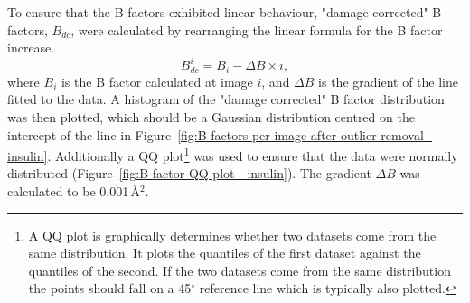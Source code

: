 To ensure that the B-factors exhibited linear behaviour, "damage corrected" B factors, $B_{dc}$, were calculated by rearranging the linear formula for the B factor increase.
\begin{equation}
    B^i_{dc} = B_i - \Delta B \times i,
\end{equation}
where $B_i$ is the B factor calculated at image $i$, and $\Delta B$ is the gradient of the line fitted to the data.
A histogram of the "damage corrected" B factor distribution was then plotted, which should be a Gaussian distribution centred on the intercept of the line in Figure~\ref{fig:B factors per image after outlier removal - insulin}.
Additionally a QQ plot\footnote{A QQ plot is graphically determines whether two datasets come from the same distribution. It plots the quantiles of the first dataset against the quantiles of the second. If the two datasets come from the same distribution the points should fall on a 45$^{\circ}$ reference line which is typically also plotted.} was used to ensure that the data were normally distributed (Figure~\ref{fig:B factor QQ plot - insulin}).
The gradient $\Delta B$ was calculated to be 0.001$\,$\AA$^2$.
